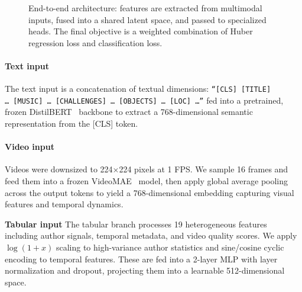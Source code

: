 \documentclass{article}
\begin{document}
\begin{figure}[h]
{
}
\caption{End-to-end architecture: features are extracted from multimodal inputs,
fused into a shared latent space, and passed to specialized heads. The final
objective is a weighted combination of Huber regression loss and classification loss.}
\label{fig:architecture}
\end{figure}

\paragraph{Text input}
The text input is a concatenation of textual dimensions:
\texttt{``[CLS] [TITLE] \dots\ [MUSIC] \dots\ [CHALLENGES] \dots\ [OBJECTS] \dots\ [LOC] \dots''}
fed into a pretrained, frozen DistilBERT~\cite{sanh2019distilbert} backbone to extract a 768-dimensional semantic representation from the [CLS] token.

\paragraph{Video input}
Videos were downsized to 224$\times$224 pixels at 1 FPS. We sample 16 frames and feed them into a frozen VideoMAE~\cite{tong2022videomae} model, then apply global average pooling across the output tokens to yield a 768-dimensional embedding capturing visual features and temporal dynamics.

\textbf{Tabular input}
The tabular branch processes 19 heterogeneous features including author signals,
temporal metadata, and video quality scores. We apply $\log(1{+}x)$ scaling to
high-variance author statistics and sine/cosine cyclic encoding to temporal
features. These are fed into a 2-layer MLP with layer normalization and dropout,
projecting them into a learnable 512-dimensional space.
\end{document}
